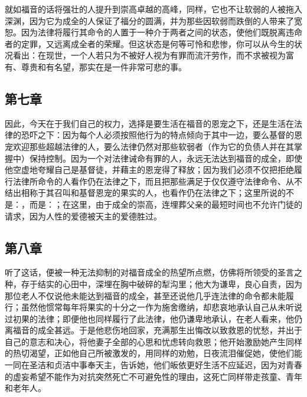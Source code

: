 \par

就如福音的话将强壮的人提升到崇高卓越的高峰，同样，它也不让软弱的人被拖入深渊，因为它为成全的人保证了福分的圆满，并为那些因软弱而跌倒的人带来了宽恕。因为法律将履行其命令的人置于一种介于两者之间的状态，使他们既脱离违命者的定罪，又远离成全者的荣耀。但这状态是何等可怜和悲惨，你可以从今生的状况看出：在现世，一个人若只为不被好人视为有罪而流汗劳作，而不求被视为富有、尊贵和有名望，那实在是一件非常可悲的事。\par


\subsection{第七章}

\par

因此，今天在于我们自己的权力，选择是要生活在福音的恩宠之下，还是生活在法律的恐吓之下：因为每个人必须按照他行为的特点倾向于其中一边，要么基督的恩宠欢迎那些超越法律的人，要么法律仍然对那些软弱者（作为它的负债人并在其掌握中）保持控制。因为一个对法律诫命有罪的人，永远无法达到福音的成全，即使他空虚地夸耀自己是基督徒，并藉主的恩宠得了释放；因为我们必须不仅把拒绝履行法律所命令的人看作仍在法律之下，而且把那些满足于仅仅遵守法律命令、从不结出相称于其召叫和基督恩宠的果实的人，也看作仍在法律之下；这里所说的不是：，而是：；在这里，由于成全的崇高，连埋葬父亲的最短时间也不允许门徒的请求，因为人性的爱德被天主的爱德胜过。\par


\subsection{第八章}

\par

听了这话，便被一种无法抑制的对福音成全的热望所点燃，仿佛将所领受的圣言之种，存于结实的心田中，深埋在胸中破碎的犁沟里；他大为谦卑，良心自责，因为那位老人不仅说他未能达到福音的成全，甚至还说他几乎连法律的命令都未能履行；虽然他惯常每年将果实的十分之一作为施舍缴纳，却悲哀地承认自己从未听说过初果的法律；即便他也同样履行了此法律，他仍谦卑地承认，在老人看来，他仍离福音的成全甚远。于是他悲伤地回家，充满那生出悔改以致救恩的忧愁，并出于自己的意志和决心，将他妻子全部的心思和忧虑转向救恩；他开始激励她产生同样的热切渴望，正如他自己所被激发的，用同样的劝勉，日夜流泪催促她，使他们能一同在圣洁和贞洁中事奉天主，告诉她，他们皈依更好生活不应延迟，因为对青春的虚妄希望不能作为对抗突然死亡不可避免性的理由，这死亡同样带走孩童、青年和老年人。\par

